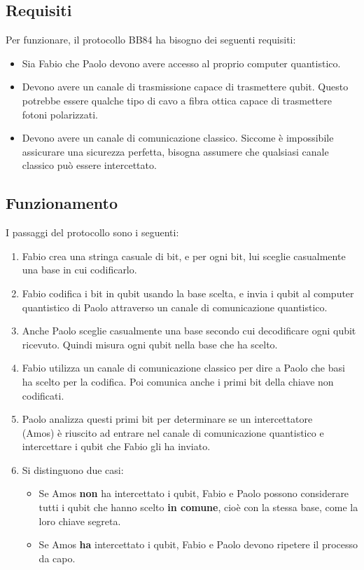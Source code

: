 \documentclass[a4paper]{article}
\begin{document}
\subsection{Requisiti}
Per funzionare, il protocollo BB84 ha bisogno dei seguenti requisiti:
\begin{itemize}
  \item Sia Fabio che Paolo devono avere accesso al proprio computer quantistico.

  \item Devono avere un canale di trasmissione capace di trasmettere qubit. Questo
    potrebbe essere qualche tipo di cavo a fibra ottica capace di trasmettere fotoni
    polarizzati.

  \item Devono avere un canale di comunicazione classico. Siccome è impossibile
    assicurare una sicurezza perfetta, bisogna assumere che qualsiasi canale classico
    può essere intercettato.
\end{itemize}

\subsection{Funzionamento}
I passaggi del protocollo sono i seguenti:
\begin{enumerate}
  \item Fabio crea una stringa casuale di bit, e per ogni bit, lui sceglie casualmente
    una base in cui codificarlo.

  \item Fabio codifica i bit in qubit usando la base scelta, e invia i qubit al computer
    quantistico di Paolo attraverso un canale di comunicazione quantistico.

  \item Anche Paolo sceglie casualmente una base secondo cui decodificare ogni qubit
    ricevuto. Quindi misura ogni qubit nella base che ha scelto.

  \item Fabio utilizza un canale di comunicazione classico per dire a Paolo che basi
    ha scelto per la codifica. Poi comunica anche i primi bit della chiave non codificati.

  \item Paolo analizza questi primi bit per determinare se un intercettatore\\
    (Amos) è riuscito ad entrare nel canale di comunicazione quantistico e intercettare i
    qubit che Fabio gli ha inviato.

  \item Si distinguono due casi:
    \begin{itemize}
    \item Se Amos \textbf{non} ha intercettato i qubit, Fabio e Paolo possono considerare
      tutti i qubit che hanno scelto \textbf{in comune}, cioè con la stessa base, come
      la loro chiave segreta.

    \item Se Amos \textbf{ha} intercettato i qubit, Fabio e Paolo devono ripetere il
      processo da capo.
  \end{itemize}
\end{enumerate}
\end{document}
